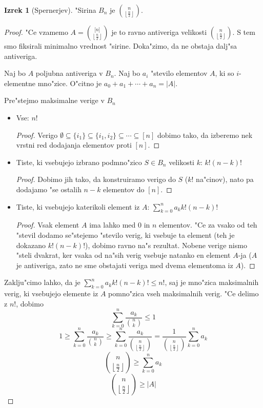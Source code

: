 \documentclass[a4paper,12pt]{article}
\theoremstyle{definition}
\newtheorem{theorem}[counter]{Izrek}
\theoremstyle{remark}
\begin{document}
\begin{theorem}[Spernerjev]
	"Sirina $B_n$ je $\binom{n}{\left\lfloor \frac{n}{2} \right\rfloor}$.
\end{theorem}
\begin{proof}
	"Ce vzamemo $A=\binom{\lbrack n \rbrack}{\left\lfloor \frac{n}{2} \right\rfloor}$ je to ravno antiveriga velikosti $\binom{n}{\left\lfloor \frac{n}{2} \right\rfloor}$. S tem smo fiksirali minimalno vrednost "sirine. Doka"zimo, da ne obstaja dalj"sa antiveriga.
	
	Naj bo $A$ poljubna antiveriga v $B_n$. Naj bo $a_i$ "stevilo elementov $A$, ki so $i$-elementne mno"zice. O"citno je $a_0 + a_1 + \cdots + a_n = |A|$.
	
	Pre"stejmo maksimalne verige v $B_n$
	\begin{itemize}
		\item Vse: $n!$
		\begin{proof}
			Verigo $\emptyset \subseteq \{i_1\} \subseteq \{i_1, i_2\} \subseteq \cdots \subseteq [n]$ dobimo tako, da izberemo nek vrstni red dodajanja elementov proti $[n]$.
		\end{proof}
		\item Tiste, ki vsebujejo izbrano podmno"zico $S \in B_n$ velikosti $k$: $k!(n-k)!$
		\begin{proof}
			Dobimo jih tako, da konstruiramo verigo do $S$ ($k!$ na"cinov), nato pa dodajamo "se ostalih $n-k$ elementov do $[n]$.
		\end{proof}
		\item Tiste, ki vsebujejo katerikoli element iz $A$: $\sum_{k=0}^na_kk!(n-k)!$
		\begin{proof}
			Vsak element $A$ ima lahko med $0$ in $n$ elementov. "Ce za vsako od teh "stevil dodamo se"stejemo "stevilo verig, ki vsebuje ta element (teh je dokazano $k!(n-k)!$), dobimo ravno na"s rezultat. Nobene verige nismo "steli dvakrat, ker vsaka od na"sih verig vsebuje natanko en element $A$-ja ($A$ je antiveriga, zato ne sme obstajati veriga med dvema elementoma iz $A$).
		\end{proof}
	\end{itemize}
	Zaklju"cimo lahko, da je $\sum_{k=0}^na_kk!(n-k)! \leqslant n!$, saj je mno"zica maksimalnih verig, ki vsebujejo elemente iz $A$ pomno"zica vseh maksimalnih verig. "Ce delimo z $n!$, dobimo
	\[\sum_{k = 0}^n\frac{a_k}{\binom{n}{k}} \leqslant 1\]
	\[
		1 \geq
		\sum_{k = 0}^n\frac{a_k}{\binom{n}{k}} \geq
		\sum_{k = 0}^n\frac{a_k}{\binom{n}{\left\lfloor\frac{n}{2}\right\rfloor}} =
		\frac{1}{\binom{n}{\left\lfloor\frac{n}{2}\right\rfloor}}\sum_{k = 0}^na_k
	\]
	\[\binom{n}{\left\lfloor\frac{n}{2}\right\rfloor} \geq \sum_{k=0}^na_k\]
	\[\binom{n}{\left\lfloor\frac{n}{2}\right\rfloor} \geq |A|\]
\end{proof}
\end{document}

